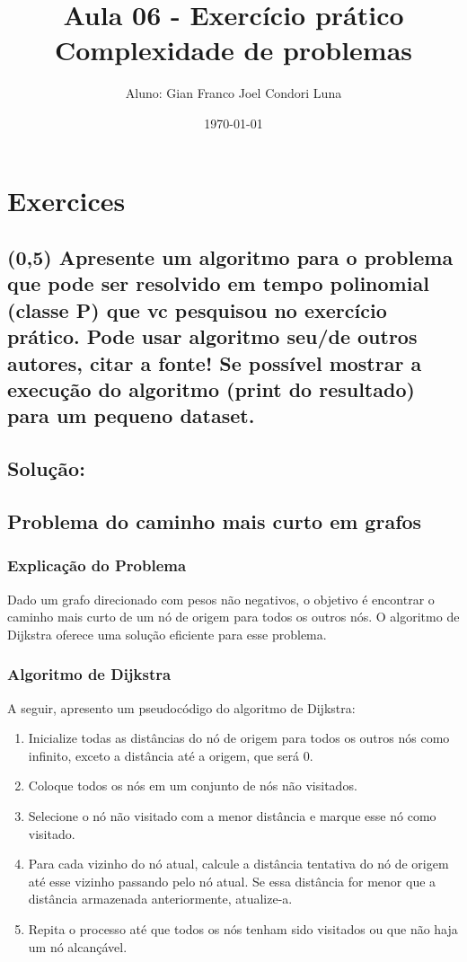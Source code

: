 \documentclass{article}
\title{Aula 06 - Exercício prático Complexidade de problemas}
\author{Aluno: Gian Franco Joel Condori Luna}
\date{\today}
\begin{document}
\maketitle

\section*{Exercices}
\setcounter{section}{1}
\subsection {(0,5) Apresente um algoritmo para o problema que pode ser resolvido em tempo
polinomial (classe P) que vc pesquisou no exercício prático. Pode usar algoritmo
seu/de outros autores, citar a fonte! Se possível mostrar a execução do algoritmo
(print do resultado) para um pequeno dataset.}

\subsection*{Solução:}

\subsection*{Problema do caminho mais curto em grafos}

\subsubsection{Explicação do Problema}

Dado um grafo direcionado com pesos não negativos, o objetivo é 
encontrar o caminho mais curto de um nó de origem para todos os 
outros nós. O algoritmo de Dijkstra oferece uma solução eficiente 
para esse problema.

\subsubsection{Algoritmo de Dijkstra}
A seguir, apresento um pseudocódigo do algoritmo de Dijkstra:
\begin{enumerate}
    \item Inicialize todas as distâncias do nó de origem para todos 
    os outros nós como infinito, exceto a distância até a origem, 
    que será 0.
    \item Coloque todos os nós em um conjunto de nós não visitados.
    \item Selecione o nó não visitado com a menor distância e marque 
    esse nó como visitado.
    \item Para cada vizinho do nó atual, calcule a distância 
    tentativa do nó de origem até esse vizinho passando pelo nó atual. 
    Se essa distância for menor que a distância armazenada 
    anteriormente, atualize-a.
    \item Repita o processo até que todos os nós tenham sido 
    visitados ou que não haja um nó alcançável.
\end{enumerate}
\end{document}
